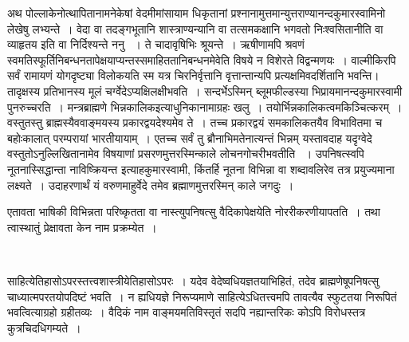 अथ पोल्लाकेनोत्थापितानामनेकेषां वेदमीमांसायाम धिकृतानां प्रश्नानामुत्तमान्युत्तराण्यानन्दकुमारस्वामिनो  लेखेषु लभ्यन्ते~। वेदा वा तदङ्गभूतानि शास्त्राण्यन्यानि वा तत्समकक्षानि भगवतो निःश्वसितानीति वा व्याहृतय इति वा निर्दिश्यन्ते ननु ~। ते चादावृषिभिः श्रूयन्ते~। ऋषीणामपि श्रवणं स्वमतिस्फूर्तिनिबन्धनतापेक्षयाप्यन्तस्समाहिततानिबन्धनमेवेति विषये न विशेरते विद्वन्मणयः~। वाल्मीकिरपि सर्वं रामायणं योगदृष्ट्या विलोकयति स्म यत्र चिरनिर्वृत्तानि वृत्तान्तान्यपि प्रत्यक्षमिव\break दर्शितानि भवन्ति। तादृक्षस्य प्रतिभानस्य मूलं चर्ग्वेदेऽप्यक्षिलक्षीभवति~। सन्दर्भेऽस्मिन् ब्लूम\-फील्डस्या भिप्रायमानन्दकुमारस्वामी पुनरुच्चरति~। मन्त्रब्राह्मणे
 भिन्नकालिक\break इत्याधुनिकानामाग्रहः खलु~। तयोर्भिन्नकालिकत्वमकिञ्चित्करम्~। वस्तुतस्तु \hbox{ब्राह्म\-स्यैव}\break वाङ्मयस्य प्रकारद्वयदेश्यमेव ते~। तच्च प्रकारद्वयं समकालिकतयैव विभावितमा च बहोः\break कालात् परम्परायां भारतीयायाम्~। एतच्च सर्वं तु ब्रौनाभिमतेनात्यन्तं भिन्नम्  यस्तावदाह यदृग्वेदे वस्तुतोऽनुल्लिखितानामेव विषयाणां प्रसरणमुत्तरस्मिन्काले लोचनगोचरीभवतीति ~। उपनिषत्स्वपि नूतनास्सिद्धान्ता नाविष्क्रियन्त इत्याह\break कुमारस्वामी, किंतर्हि नूतना विभिन्ना वा शब्दावलिरेव तत्र प्रयुज्यमाना लक्ष्यते~। उदाहरणार्थं यं वरुणमाहुर्वेदे तमेव ब्रह्माणमुत्तरस्मिन् काले जगदुः~।

एतावता भाषिकी विभिन्नता परिष्कृतता वा नास्त्युपनिषत्सु वैदिकापेक्षयेति नोररीकरणीयापतति~। तथा त्वास्थातुं प्रेक्षावता केन नाम प्रक्रम्येत~।

\begin{myquote}

~\hfill {}
\end{myquote}

साहित्येतिहासोऽपरस्तत्त्वशास्त्रीयेतिहासोऽपरः~। यदेव वेदेष्वधियज्ञतयाभिहितं, तदेव ब्राह्मणेषूपनिषत्सु चाध्यात्मपरतयोपदिष्टं भवति~। न ह्यधियज्ञे निरूप्यमाणे साहित्येऽधितत्त्वमपि तावत्यैव स्फुटतया निरूपितं भवत्वित्याग्रहो ग्रहीतव्यः~। वैदिकं नाम वाङ्मयमतिविस्तृतं सदपि नह्यान्तरिकः कोऽपि विरोधस्तत्र कुत्रचिदधिगम्यते~।

